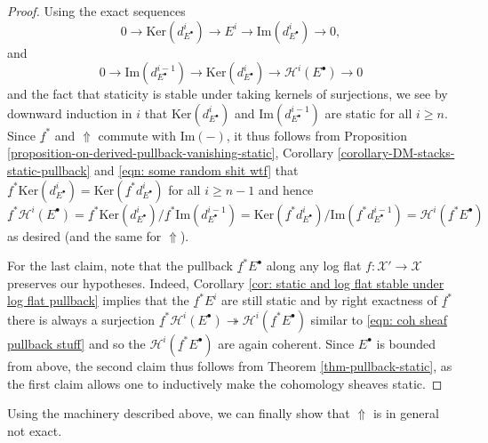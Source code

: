\documentclass[11pt]{amsart}
\theoremstyle{definition}
\theoremstyle{definition}
\newcommand{\ul}[1]{\underline{#1}}
\begin{document}
\begin{proof}
    Using the exact sequences 
    \begin{equation}\label{eqn: some random shit wtf}
        0\longrightarrow \text{Ker}(d^{i}_{E^\bullet}) \longrightarrow E^i \longrightarrow \text{Im}(d^i_{E^\bullet})\longrightarrow 0,
    \end{equation}
    and
    \[
        0\longrightarrow \text{Im}(d^{i-1}_{E^\bullet})\longrightarrow \text{Ker}(d^{i}_{E^\bullet})\longrightarrow \mathcal{H}^{i}(E^\bullet)\longrightarrow 0
    \]
    and the fact that staticity is stable under taking kernels of surjections, we see by downward induction in $i$ that $\text{Ker}(d^{i}_{E^\bullet})$ and $\text{Im}(d^{i-1}_{E^\bullet})$ are static for all $i\geq n$. Since $\ul{f}^*$ and $\Uparrow$ commute with $\text{Im}({-})$, it thus follows from Proposition \ref{proposition-on-derived-pullback-vanishing-static}, Corollary \ref{corollary-DM-stacks-static-pullback} and \eqref{eqn: some random shit wtf} that $\ul{f}^*\text{Ker}(d^{i}_{E^\bullet}) = \text{Ker}(\ul{f}^*d^{i}_{E^\bullet})$ for all $i\geq n-1$ and hence 
    \begin{equation}\label{eqn: coh sheaf pullback stuff}
        \ul{f}^*\mathcal{H}^i(E^\bullet) = \ul{f}^*\text{Ker}(d^{i}_{E^\bullet})/\ul{f}^*\text{Im}(d^{i-1}_{E^\bullet}) = \text{Ker}(\ul{f}^*d^{i}_{E^\bullet})/\text{Im}(\ul{f}^*d^{i-1}_{E^\bullet}) = \mathcal{H}^i(\ul{f}^*E^\bullet)
    \end{equation}
    as desired (and the same for $\Uparrow$).
    
    For the last claim, note that the pullback $\ul{f}^* E^\bullet$ along any log flat $f\colon \mathcal{X}'\rightarrow \mathcal{X}$ preserves our hypotheses. Indeed, Corollary \ref{cor: static and log flat stable under log flat pullback} implies that the $\ul{f}^* E^{i}$ are still static and by right exactness of $\ul{f}^*$ there is always a surjection $\ul{f}^*\mathcal{H}^{i}(E^\bullet)\twoheadrightarrow \mathcal{H}^{i}(\ul{f}^* E^\bullet)$ similar to \eqref{eqn: coh sheaf pullback stuff} and so the $\mathcal{H}^{i}(\ul{f}^* E^\bullet)$ are again coherent. Since $E^\bullet$ is bounded from above, the second claim thus follows from Theorem \ref{thm-pullback-static}, as the first claim allows one to inductively make the cohomology sheaves static.
\end{proof}
Using the machinery described above, we can finally show that $\Uparrow$ is in general not exact.
\end{document}
